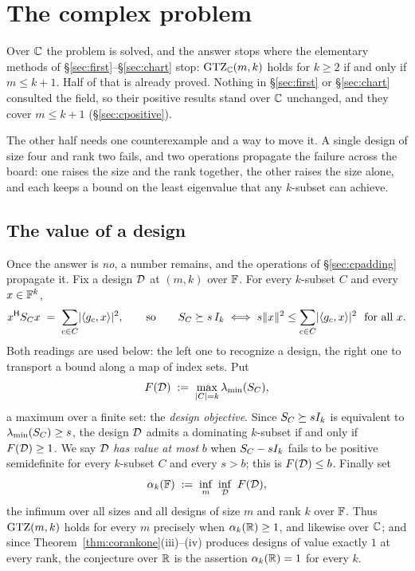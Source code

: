\section{The complex problem}\label{sec:complex}

Over $\mathbb{C}$ the problem is solved, and the answer stops where the
elementary methods of \S\ref{sec:first}--\S\ref{sec:chart} stop:
$\mathrm{GTZ}_{\mathbb{C}}(m,k)$ holds for $k\ge2$ if and only if $m\le k+1$.  Half of that
is already proved.  Nothing in \S\ref{sec:first} or \S\ref{sec:chart}
consulted the field, so their positive results stand over $\mathbb{C}$
unchanged, and they cover $m\le k+1$ (\S\ref{sec:cpositive}).

The other half needs one counterexample and a way to move it.  A single
design of size four and rank two fails, and two operations propagate the
failure across the board: one raises the size and the rank together, the
other raises the size alone, and each keeps a bound on the least
eigenvalue that any $k$-subset can achieve.

\subsection{The value of a design}\label{sec:cvalue}

Once the answer is \emph{no}, a number remains, and the operations of
\S\ref{sec:cpadding} propagate it.  Fix a
design $\mathcal{D}$ at $(m,k)$ over $\mathbb{F}$.  For every $k$-subset $C$ and every
$x\in\mathbb{F}^k$,
\begin{equation}\label{eq:cover}
  x^{\mathsf{H}}S_{C} x\;=\;\sum_{c\in C}\lvert\langle g_c,x\rangle\rvert^{2},
  \qquad\text{so}\qquad
  S_{C}\succeq s\,I_k
  \iff
  s\lVert x\rVert^{2}\le\sum_{c\in C}\lvert\langle g_c,x\rangle\rvert^{2}
  \ \ \text{for all }x .
\end{equation}
Both readings are used below: the left one to recognize a design, the
right one to transport a bound along a map of index sets.  Put
\begin{equation}\label{eq:value}
  F(\mathcal{D})\;:=\;\max_{\lvert C\rvert=k}\lambda_{\min}(S_{C}),
\end{equation}
a maximum over a finite set: the \emph{design objective}.  Since
$S_{C}\succeq sI_k$ is equivalent to $\lambda_{\min}(S_{C})\ge s$, the design $\mathcal{D}$
admits a dominating $k$-subset if and only if $F(\mathcal{D})\ge1$.
We say $\mathcal{D}$ \emph{has value at most} $b$ when $S_{C}-sI_k$ fails to be
positive semidefinite for every $k$-subset $C$ and every $s>b$; this is
$F(\mathcal{D})\le b$.  Finally set
\[
  \alpha_k(\FF)\;:=\;\inf_{m}\ \inf_{\dsn}\ F(\dsn),
\]
the infimum over all sizes and all designs of size $m$ and rank $k$ over
$\mathbb{F}$.  Thus $\mathrm{GTZ}(m,k)$ holds for every $m$ precisely when
$\alpha_k(\mathbb{R})\ge1$, and likewise over $\mathbb{C}$; and since
Theorem~\ref{thm:corankone}(iii)--(iv) produces designs of value exactly
$1$ at every rank, the conjecture over $\mathbb{R}$ is the assertion
$\alpha_k(\mathbb{R})=1$ for every $k$.

